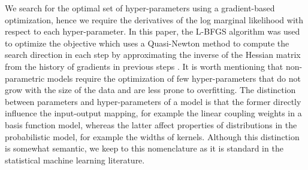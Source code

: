 \documentclass[useAMS,usenatbib,fleqn]{mn2e}
\begin{document}
We search for the optimal set of hyper-parameters using a gradient-based optimization, hence we require the derivatives of the log marginal likelihood with respect to each hyper-parameter. In this paper, the L-BFGS algorithm was used to optimize the objective which uses a Quasi-Newton method to compute the search direction in each step by approximating the inverse of the Hessian matrix from the history of gradients in previous steps \citep{jorge1980,schmidt2005}. It is worth mentioning that non-parametric models require the optimization of few hyper-parameters that do not grow with the size of the data and are less prone to overfitting. The distinction between parameters and hyper-parameters of a model is that the former directly influence the input-output mapping, for example the linear coupling weights in a basis function model, whereas the latter affect properties of distributions in the probabilistic model, for example the widths of kernels. Although this distinction is somewhat semantic, we keep to this nomenclature as it is standard in the statistical machine learning literature.
\end{document}
